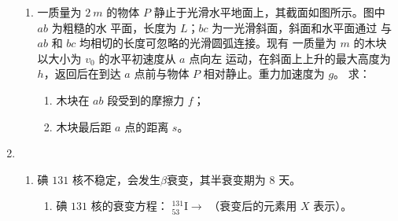 \begin{enumerate}
\begin{enumerate}
  
\item 
一质量为 $ 2 \ m $ 的物体 $ P $ 静止于光滑水平地面上，其截面如图所示。图中 $ ab $ 为粗糙的水
平面，长度为 $ L $；$ bc $ 为一光滑斜面，斜面和水平面通过
与 $ ab $ 和 $ bc $ 均相切的长度可忽略的光滑圆弧连接。现有
一质量为 $ m $ 的木块以大小为 $ v_{0} $ 的水平初速度从 $ a $ 点向左
运动，在斜面上上升的最大高度为 $ h $，返回后在到达 $ a $ 点前与物体 $ P $ 相对静止。重力加速度为 $ g $。
求：
\begin{enumerate}
	\item
木块在 $ ab $ 段受到的摩擦力 $ f $；
\item 
木块最后距 $ a $ 点的距离 $ s $。
\end{enumerate}
\begin{figure}[h!]
	\flushright
	
\end{figure}



	
\end{enumerate}


\item 
{}
\begin{enumerate}
	\item
碘 $ 131 $ 核不稳定，会发生$ \beta $衰变，其半衰变期为 $ 8 $ 天。
\begin{enumerate}
	\item
碘 $ 131 $ 核的衰变方程： ${ }_{53}^{131} \mathrm{I} \rightarrow$  \underlinegap （衰变后的元素用 $ X $ 表示）。


\end{enumerate}
\end{enumerate}
\end{enumerate}
